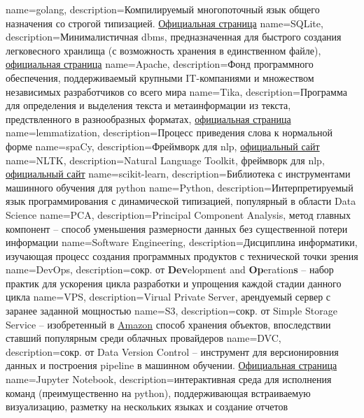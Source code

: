 {
    name=golang,
    description={Компилируемый многопоточный язык общего назначения со строгой типизацией. \href{https://go.dev/}{Официальная страница}}
}
{
    name=SQLite,
    description={Минималистичная \acrshort{dbms}, предназначенная для быстрого создания легковесного хранлища (с возможность хранения в единственном файле), \href{https://www.sqlite.org/index.html}{официальная страница}}
}
{
    name=Apache,
    description={Фонд программного обеспечения, поддерживаемый крупными IT-компаниями и множеством независимых разработчиков со всего мира}
}
{
    name=Tika,
    description={Программа для определения и выделения текста и метаинформации из текста, предствленного в разнообразных форматах, \href{https://tika.apache.org/}{официальная страница}}
}
{
    name=lemmatization,
    description={Процесс приведения слова к нормальной форме}
}
{
    name=spaCy,
    description={Фреймворк для \acrshort{nlp}, \href{https://spacy.io/}{официальный сайт}}
}
{
    name=NLTK,
    description={Natural Language Toolkit, фреймворк для \acrshort{nlp}, \href{https://www.nltk.org/}{официальный сайт}}
}
{
    name=scikit-learn,
    description={Библиотека с инструментами машинного обучения для \gls{python}}
}
{
    name=Python,
    description={Интерпретируемый язык программирования с динамической типизацией, популярный в области Data Science}
}
{
    name=PCA,
    description={Principal Component Analysis, метод главных компонент -- способ уменьшения размерности данных без существенной потери информации}
}
{
    name=Software Engineering,
    description={Дисциплина информатики, изучающая процесс создания программных продуктов с технической точки зрения}
}
{
    name=DevOps,
    description={сокр. от \textbf{Dev}elopment and \textbf{Op}eration\textbf{s} -- набор практик для ускорения цикла разработки и упрощения каждой стадии данного цикла}
}
{
    name=VPS,
    description={Virual Private Server, арендуемый сервер с заранее заданной мощностью}
}
{
    name=S3,
    description={сокр. от Simple Storage Service -- изобретенный в \href{https://aws.amazon.com}{Amazon} способ хранения объектов, впоследствии ставший популярным среди облачных провайдеров}
}
{
    name=DVC,
    description={сокр. от Data Version Control -- инструмент для версионировния данных и построения \gls{pipeline} в машинном обучении. \href{https://dvc.org/}{Официальная страница}}
}
{
    name=Jupyter Notebook,
    description={интерактивная среда для исполнения команд (преимущественно на \gls{python}), поддерживающая встраиваемую визуализацию, разметку на нескольких языках и создание отчетов}
}
